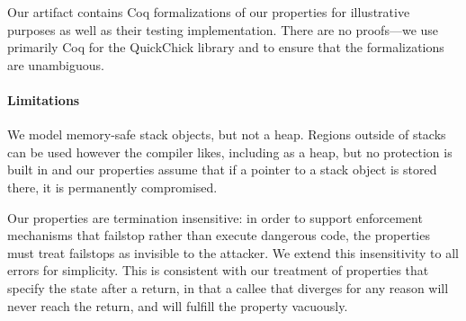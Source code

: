 Our artifact contains Coq formalizations of our properties for illustrative purposes
as well as their testing implementation. There are no proofs---we use primarily Coq for the
QuickChick library and to ensure that the formalizations are unambiguous.
%

\paragraph*{Limitations}

We model memory-safe stack objects, but not a heap. Regions outside of
stacks can be used however the compiler likes, including as a heap, but no protection is
built in and our properties assume that if a pointer to a stack object is stored there,
it is permanently compromised.

Our properties are termination insensitive: in order to support enforcement mechanisms
that failstop rather than execute dangerous code, the properties must treat failstops
as invisible to the attacker. We extend this insensitivity to all errors for simplicity.
This is consistent with our treatment of properties that specify the state after a return,
in that a callee that diverges for any reason will never reach the return, and will fulfill
the property vacuously.
%
